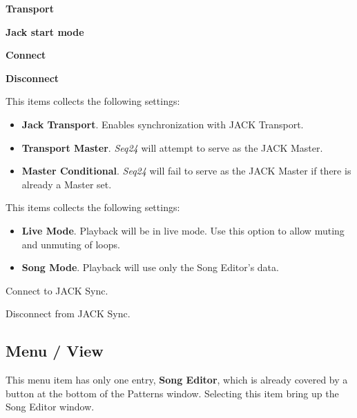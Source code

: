    \begin{enumber}
      \item \textbf{Transport}
      \item \textbf{Jack start mode}
      \item \textbf{Connect}
      \item \textbf{Disconnect}
   \end{enumber}

   \setcounter{ItemCounter}{0}      %

   This items collects the following settings:

   \begin{itemize}
      \item \textbf{Jack Transport}.
         Enables synchronization with JACK Transport.
      \item \textbf{Transport Master}.
         \textsl{Seq24} will attempt to serve as the JACK Master.
      \item \textbf{Master Conditional}.
         \textsl{Seq24} will fail to serve as the JACK Master if there is
         already a Master set.
   \end{itemize}

   This items collects the following settings:

   \begin{itemize}
      \item \textbf{Live Mode}.
         Playback will be in live mode.  Use this option to allow muting and
         unmuting of loops.
      \item \textbf{Song Mode}.
         Playback will use only the Song Editor's data.
   \end{itemize}

   Connect to JACK Sync.

   Disconnect from JACK Sync.

\subsection{Menu / View}
\label{subsec:seq24_menu_view}

   This menu item has only one entry, \textbf{Song Editor}, 
   which is already covered by a button at the bottom of the Patterns
   window.  Selecting this item bring up the Song Editor window.

